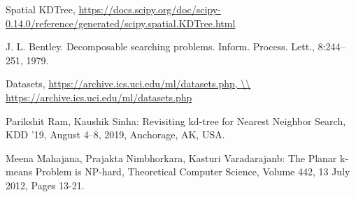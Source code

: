 \begin{thebibliography}{99.}
 Spatial KDTree, 
\url{https://docs.scipy.org/doc/scipy-0.14.0/reference/generated/scipy.spatial.KDTree.html}

 J. L. Bentley. Decomposable searching problems. Inform. Process. Lett., 8:244–
251, 1979.

 Datasets, 
\url{https://archive.ics.uci.edu/ml/datasets.php, \\ https://archive.ics.uci.edu/ml/datasets.php}

 Parikshit Ram, Kaushik Sinha: Revisiting kd-tree for Nearest Neighbor Search, KDD ’19, August 4–8, 2019, Anchorage, AK, USA.

 Meena Mahajana, Prajakta Nimbhorkara, Kasturi Varadarajanb: The Planar k-means Problem is NP-hard, Theoretical Computer Science,
Volume 442, 13 July 2012, Pages 13-21.

%
\end{thebibliography}
